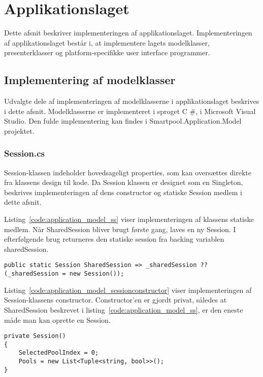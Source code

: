 \section{Applikationslaget}
Dette afsnit beskriver implementeringen af applikationslaget. Implementeringen af applikationslaget består i, at implementere lagets modelklasser, presenterklasser og platform-specifikke user interface programmer. 

\subsection{Implementering af modelklasser}
Udvalgte dele af implementeringen af modelklasserne i applikationslaget beskrives i dette afsnit. Modelklasserne er implementeret i sproget C \#, i Microsoft Visual Studio. Den fulde implementering kan findes i Smartpool.Application.Model projektet.

\subsubsection{Session.cs}
Session-klassen indeholder hovedsageligt properties, som kan oversættes direkte fra klassens design til kode. Da Session klassen er designet som en Singleton, beskrives implementeringen af dens constructor og statiske Session medlem i dette afsnit.

Listing~\ref{code:application_model_ss} viser implementeringen af klassens statiske medlem. Når SharedSession bliver brugt første gang, laves en ny Session. I efterfølgende brug returneres den statiske session fra backing variablen sharedSession.

\begin{lstlisting}[caption={SharedSession},label={code:application_model_ss}]
public static Session SharedSession => _sharedSession ?? (_sharedSession = new Session());
\end{lstlisting}

Listing~\ref{code:application_model_sessionconstructor} viser implementeringen af Session-klassens constructor. Constructor'en er gjordt privat, således at SharedSession beskrevet i listing~\ref{code:application_model_ss}, er den eneste måde man kan oprette en Session.

\begin{lstlisting}[caption={Session constructor},label={code:application_model_sessionconstructor}]
private Session()
{
	SelectedPoolIndex = 0;
	Pools = new List<Tuple<string, bool>>();
}
\end{lstlisting}

